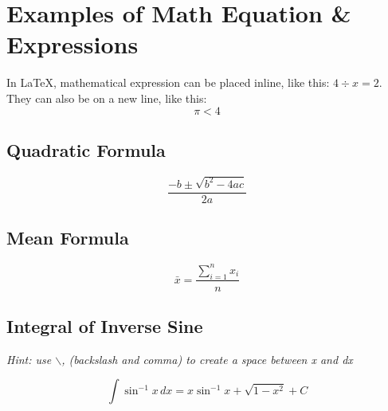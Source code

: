 \section{Examples of Math Equation \& Expressions}

In LaTeX, mathematical expression can be placed inline, like this: \(4 \div x  = 2\). They can also be on a new line, like this: \[\pi < 4\]

\subsection{Quadratic Formula}

\[\frac{-b \pm \sqrt{b^{2} - 4ac}}{2a}\]

\subsection{Mean Formula}

\[\bar{x} = \frac{\sum_{i=1}^{n} x_i}{n}\]

\subsection{Integral of Inverse Sine}

\textit{Hint: use $\backslash$, (backslash and comma) to create a space between x and dx}

\[\int \sin^{-1}x\,dx = x\sin^{-1}x + \sqrt{1-x^{2}} + C \]
